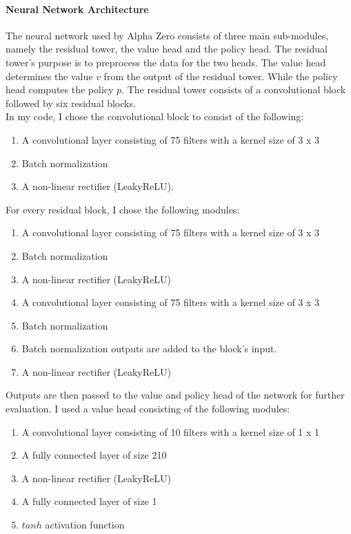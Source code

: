 \documentclass[12pt]{article}
\begin{document}
\paragraph{Neural Network Architecture} 
\label{sec:NeruralNetworkArchitecture}
The neural network used by Alpha Zero consists of three main sub-modules, namely the residual tower, the value head and the policy head. The residual tower's purpose is to preprocess the data for the two heads. The value head determines the value \(v\) from the output of the residual tower. While the policy head computes the policy \(p\). The residual tower consists of a convolutional block followed by six residual blocks.\\
In my code, I chose the convolutional block to consist of the following: 
\begin{enumerate}
\item A convolutional layer consisting of 75 filters with a kernel size of 3 x 3
\item Batch normalization \cite{ioffe2015batch}
\item A non-linear rectifier (LeakyReLU).
\end{enumerate}
For every residual block, I chose the following modules:
\begin{enumerate}
\item A convolutional layer consisting of 75 filters with a kernel size of 3 x 3
\item Batch normalization
\item A non-linear rectifier (LeakyReLU)
\item A convolutional layer consisting of 75 filters with a kernel size of 3 x 3
\item Batch normalization
\item Batch normalization outputs are added to the block's input.
\item A non-linear rectifier (LeakyReLU)
\end{enumerate}
Outputs are then passed to the value and policy head of the network for further evaluation.
I used a value head consisting of the following modules:
\begin{enumerate}
\item A convolutional layer consisting of 10 filters with a kernel size of 1 x 1
\item A fully connected layer of size 210
\item A non-linear rectifier (LeakyReLU)
\item A fully connected layer of size 1
\item \(tanh\) activation function
\end{enumerate}
\end{document}
